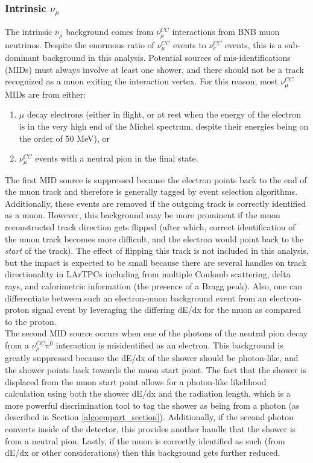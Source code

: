 \subsubsection{Intrinsic $\nu_\mu$}
The intrinsic $\nu_\mu$ background comes from $\nu_\mu^{CC}$ interactions from BNB muon neutrinos. Despite the enormous ratio of $\nu_\mu^{CC}$ events to $\nu_e^{CC}$ events, this is a sub-dominant background in this analysis. Potential sources of mis-identifications (MIDs) must always involve at least one shower, and there should not be a track recognized as a muon exiting the interaction vertex. For this reason, most $\nu_\mu^{CC}$ MIDs are from either:
\begin{enumerate}
\item $\mu$ decay electrons (either in flight, or at rest when the energy of the electron is in the very high end of the Michel spectrum, despite their energies being on the order of 50 MeV), or 
\item $\nu_\mu^{CC}$ events with a neutral pion in the final state. 
\end{enumerate}
The first MID source is suppressed because the electron points back to the end of the muon track and therefore is generally tagged by event selection algorithms. Additionally, these events are removed if the outgoing track is correctly identified as a muon. However, this background may be more prominent if the muon reconstructed track direction gets flipped (after which, correct identification of the muon track becomes more difficult, and the electron would point back to the \textit{start} of the track). The effect of flipping this track is not included in this analysis, but the impact is expected to be small because there are several handles on track directionality in LArTPCs including from multiple Coulomb scattering, delta rays, and calorimetric information (the presence of a Bragg peak). Also, one can differentiate between such an electron-muon background event from an electron-proton signal event by leveraging the differing dE/dx for the muon as compared to the proton.\\

The second MID source occurs when one of the photons of the neutral pion decay from a $\nu_\mu^{CC}\pi^0$ interaction is misidentified as an electron. This background is greatly suppressed because the dE/dx of the shower should be photon-like, and the shower points back towards the muon start point. The fact that the shower is displaced from the muon start point allows for a photon-like likelihood calculation using both the shower dE/dx and the radiation length, which is a more powerful discrimination tool to tag the shower as being from a photon (as described in Section \ref{algoempart_section}). Additionally, if the second photon converts inside of the detector, this provides another handle that the shower is from a neutral pion. Lastly, if the muon is correctly identified as such (from dE/dx or other considerations) then this background gets further reduced.

